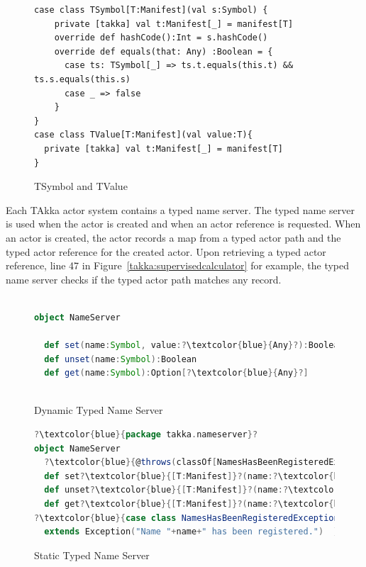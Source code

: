 \begin{figure}[h]
\label{tsymbol}
\begin{lstlisting}
case class TSymbol[T:Manifest](val s:Symbol) {
    private [takka] val t:Manifest[_] = manifest[T]
    override def hashCode():Int = s.hashCode()  
    override def equals(that: Any) :Boolean = {
      case ts: TSymbol[_] => ts.t.equals(this.t) && ts.s.equals(this.s)
      case _ => false
    }
}
case class TValue[T:Manifest](val value:T){
  private [takka] val t:Manifest[_] = manifest[T]
}
\end{lstlisting}
\caption{TSymbol and TValue}
\end{figure}

Each TAkka actor system contains a typed name server.  The typed name server is 
used when the actor is created and when an  actor reference is requested.  
When an actor is created, the actor records a map from a typed actor path and the
typed actor reference for the created actor.  Upon retrieving a typed actor
reference, line 47 in Figure~\ref {takka:supervisedcalculator} for example, the
typed name server checks if the typed actor path matches any record.





\begin{figure}[t]
\label{dynamic_name_server}
\begin{lstlisting}[language=scala, escapechar=?]

object NameServer 

  def set(name:Symbol, value:?\textcolor{blue}{Any}?):Boolean
  def unset(name:Symbol):Boolean
  def get(name:Symbol):Option[?\textcolor{blue}{Any}?]
  
\end{lstlisting}
\caption{Dynamic Typed Name Server}
\vspace{-20pt}
\end{figure}

\begin{figure}[t]
\label{static_name_server}
\begin{lstlisting}[language=scala, escapechar=?]
?\textcolor{blue}{package takka.nameserver}?
object NameServer 
  ?\textcolor{blue}{@throws(classOf[NamesHasBeenRegisteredException])}?
  def set?\textcolor{blue}{[T:Manifest]}?(name:?\textcolor{blue}{TSymbol[T]}?, value:?\textcolor{blue}{T}?):Boolean
  def unset?\textcolor{blue}{[T:Manifest]}?(name:?\textcolor{blue}{TSymbol[T]}?):Boolean
  def get?\textcolor{blue}{[T:Manifest]}?(name:?\textcolor{blue}{TSymbol[T]}?):Option[?\textcolor{blue}{T}?]
?\textcolor{blue}{case class NamesHasBeenRegisteredException(name:TSymbol[\_])
  extends Exception("Name "+name+" has been registered.")  }?
\end{lstlisting}
\caption{Static Typed Name Server}
\vspace{-10pt}
\end{figure}


